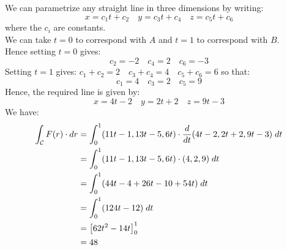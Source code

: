 \documentclass[a4paper, 10pt]{article}
\begin{document}
\begin{examplebox}[Evaluate $\int_{\mathcal{C}} F(r) \cdot dr$ for $F(r) = (y+z, x+z, x+y)$, where $\mathcal{C}$ is the line segment joinint $A:(-2,2,-3) \to B(2,4,6)$ ]
  We can parametrize any straight line in three dimensions by writing:
  $$x = c_1t + c_2 \quad y=c_3t + c_4 \quad z = c_5t + c_6$$
  where the $c_i$ are constants. \\
  We can take $t = 0$ to correspond with $A$ and $t = 1$ to correspond with $B$. \\
  Hence setting $t = 0$ gives:
  $$c_2 = -2 \quad  c_4 = 2 \quad c_6 = -3$$
  Setting $t = 1$ gives:
  $c_1 + c_2 = 2 \quad c_3 + c_4 = 4 \quad c_5 + c_6 = 6$ so that:
  $$c_1 = 4 \quad c_3 = 2 \quad c_5 = 9$$
  Hence, the required line is given by:
  $$x = 4t - 2 \quad y = 2t + 2 \quad z = 9t - 3$$
  We have:
  \begin{align*}
    \int_\mathcal{C} F(r) \cdot dr & = \int_0^1 (11t - 1, 13t -5,6t) \cdot \frac{d}{dt}(4t-2, 2t+2, 9t-3) \; dt \\
                                   & = \int_0^1 (11t - 1, 13t -5,6t) \cdot (4,2,9) \; dt                      \\
                                   & = \int_0^1 (44t - 4 + 26t - 10 + 54t) \; dt                              \\
                                   & = \int_0^1 (124t - 12) \; dt                                             \\
                                   & = \left[62t^2 - 14t\right]_0^1                                           \\
                                   & = 48
  \end{align*}
\end{examplebox}
\end{document}
